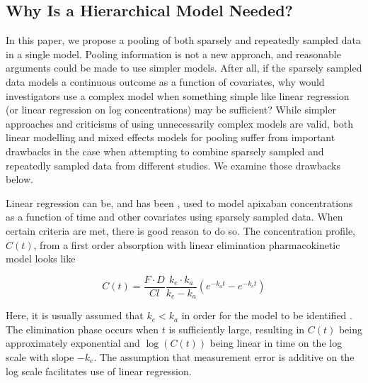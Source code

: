 \subsection{Why Is a Hierarchical Model Needed?}

In this paper, we propose a pooling of both sparsely and repeatedly sampled data in a single model. Pooling information is not a new approach, and reasonable arguments could be made to use simpler models.  After all, if the sparsely sampled data models a continuous outcome as a function of covariates, why would investigators use a complex model when something simple like linear regression (or linear regression on log concentrations) may be sufficient?  While simpler approaches and criticisms of using unnecessarily complex models are valid, both linear modelling and mixed effects models for pooling suffer from important drawbacks in the case when attempting to combine sparsely sampled and repeatedly sampled data from different studies.  We examine those drawbacks below.

Linear regression can be, and has been \cite{gulilat2020drug,vakkalagadda2016effect}, used to model apixaban concentrations as a function of time and other covariates using sparsely sampled data.  When certain criteria are met, there is good reason to do so.  The concentration profile, $C(t)$, from a first order absorption with linear elimination pharmacokinetic model looks like

$$ C(t) = \frac{F \cdot D}{C l} \frac{k_{e} \cdot k_{a}}{k_{e}-k_{a}}\left(e^{-k_{a}t}-e^{-k_{e}t}\right) $$

\noindent Here, it is usually assumed that $k_e<k_a$ in order for the model to be identified \cite{wakefield1992bayesian, salway2008gamma}. The elimination phase occurs when $t$ is sufficiently large, resulting in $C(t)$ being approximately exponential and $\log(C(t))$ being linear in time on the log scale with slope $-k_e$.  The assumption that measurement error is additive on the log scale facilitates use of linear regression.

